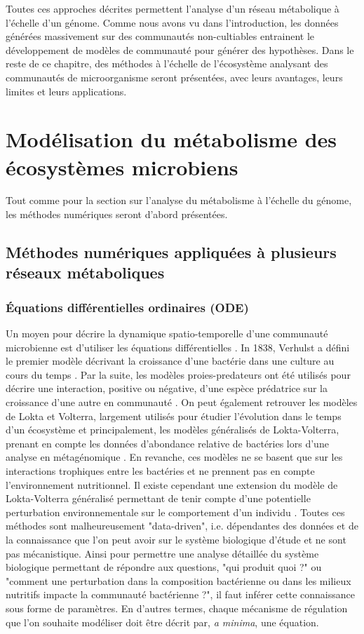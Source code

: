 \documentclass[../main.tex]{subfiles}
\begin{document}
Toutes ces approches décrites permettent l'analyse d'un réseau métabolique à l'échelle d'un génome. Comme nous avons vu dans l'introduction, les données générées massivement sur des communautés non-cultiables entrainent le développement de modèles de communauté pour générer des hypothèses. Dans le reste de ce chapitre, des méthodes à l'échelle de l'écosystème analysant des communautés de microorganisme seront présentées, avec leurs avantages, leurs limites et leurs applications.


\section{Modélisation du métabolisme des écosystèmes microbiens}
Tout comme pour la section sur l'analyse du métabolisme à l'échelle du génome, les méthodes numériques seront d'abord présentées.

\subsection{Méthodes numériques appliquées à plusieurs réseaux métaboliques}

\subsubsection{Équations différentielles ordinaires (ODE)}
Un moyen pour décrire la dynamique spatio-temporelle d'une communauté microbienne est d'utiliser les équations différentielles \citep{Succurro}. In 1838, Verhulst a défini le premier modèle décrivant la croissance d'une bactérie dans une culture au cours du temps \citep{verhulst}. Par la suite, les modèles proies-predateurs ont été utilisés pour décrire une interaction, positive ou négative, d'une espèce prédatrice sur la croissance d'une autre en communauté \citep{Nair2019}. On peut également retrouver les modèles de Lokta et Volterra, largement utilisés pour étudier l'évolution dans le temps d'un écosystème et principalement, les modèles généralisés de Lokta-Volterra, prenant en compte les données d'abondance relative de bactéries lors d'une analyse en métagénomique \citep{Berry2014}. En revanche, ces modèles ne se basent que sur les interactions trophiques entre les bactéries et ne prennent pas en compte l'environnement nutritionnel. Il existe cependant une extension du modèle de Lokta-Volterra généralisé permettant de tenir compte d'une potentielle perturbation environnementale sur le comportement d'un individu \citep{Stein2013}.
Toutes ces méthodes sont malheureusement "data-driven", i.e. dépendantes des données et de la connaissance que l'on peut avoir sur le système biologique d'étude et ne sont pas mécanistique. Ainsi pour permettre une analyse détaillée du système biologique permettant de répondre aux questions, "qui produit quoi ?" ou "comment une perturbation dans la composition bactérienne ou dans les milieux nutritifs impacte la communauté bactérienne ?", il faut inférer cette connaissance sous forme de paramètres. En d'autres termes, chaque mécanisme de régulation que l'on souhaite modéliser doit être décrit par, \textit{a minima}, une équation. 
\end{document}
